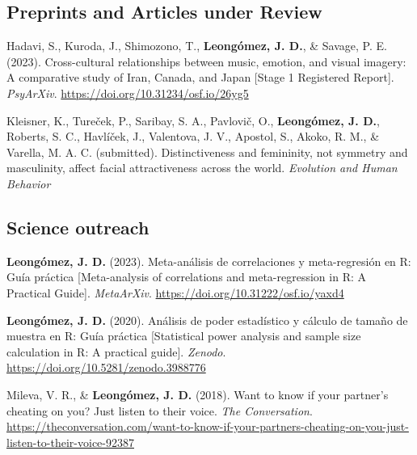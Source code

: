 \documentclass[11pt,a4paper,]{awesome-cv}
\begin{document}
\endgroup

\hypertarget{section-1}{%
\subsection{\texorpdfstring{\textbf{Preprints and Articles under Review}}{}}\label{section-1}}

\begingroup
\footnotesize
\setlength{\parindent}{-0.5in}
\setlength{\leftskip}{0.5in}

Hadavi, S., Kuroda, J., Shimozono, T., \textbf{Leongómez, J. D.}, \&
Savage, P. E. (2023). Cross-cultural relationships between music,
emotion, and visual imagery: A comparative study of Iran, Canada, and
Japan {[}Stage 1 Registered Report{]}. \emph{PsyArXiv}.
\url{https://doi.org/10.31234/osf.io/26yg5}

Kleisner, K., Tureček, P., Saribay, S. A., Pavlovič, O.,
\textbf{Leongómez, J. D.}, Roberts, S. C., Havlíček, J., Valentova, J.
V., Apostol, S., Akoko, R. M., \& Varella, M. A. C. (submitted).
Distinctiveness and femininity, not symmetry and masculinity, affect
facial attractiveness across the world. \emph{Evolution and Human
Behavior}

\endgroup

\hypertarget{section-2}{%
\subsection{\texorpdfstring{\textbf{Science outreach}}{}}\label{section-2}}

\begingroup
\footnotesize
\setlength{\parindent}{-0.5in}
\setlength{\leftskip}{0.5in}

\textbf{Leongómez, J. D.} (2023). Meta-análisis de correlaciones y
meta-regresión en R: Guía práctica {[}Meta-analysis of correlations and
meta-regression in R: A Practical Guide{]}. \emph{MetaArXiv}.
\url{https://doi.org/10.31222/osf.io/yaxd4}

\textbf{Leongómez, J. D.} (2020). Análisis de poder estadístico y
cálculo de tamaño de muestra en R: Guía práctica {[}Statistical power
analysis and sample size calculation in R: A practical guide{]}.
\emph{Zenodo}. \url{https://doi.org/10.5281/zenodo.3988776}

Mileva, V. R., \& \textbf{Leongómez, J. D.} (2018). Want to know if your
partner's cheating on you? Just listen to their voice. \emph{The
Conversation}.
\url{https://theconversation.com/want-to-know-if-your-partners-cheating-on-you-just-listen-to-their-voice-92387}
\end{document}
